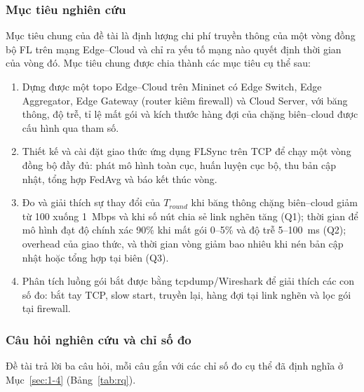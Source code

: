 \subsubsection{Mục tiêu nghiên cứu}
Mục tiêu chung của đề tài là định lượng chi phí truyền thông của một vòng đồng bộ FL trên mạng Edge--Cloud và chỉ ra yếu tố mạng nào quyết định thời gian của vòng đó. Mục tiêu chung được chia thành các mục tiêu cụ thể sau:
\begin{enumerate}
    \item Dựng được một topo Edge--Cloud trên Mininet có Edge Switch, Edge Aggregator, Edge Gateway (router kiêm firewall) và Cloud Server, với băng thông, độ trễ, tỉ lệ mất gói và kích thước hàng đợi của chặng biên--cloud được cấu hình qua tham số.
    \item Thiết kế và cài đặt giao thức ứng dụng FLSync trên TCP để chạy một vòng đồng bộ đầy đủ: phát mô hình toàn cục, huấn luyện cục bộ, thu bản cập nhật, tổng hợp FedAvg và báo kết thúc vòng.
    \item Đo và giải thích sự thay đổi của $T_{round}$ khi băng thông chặng biên--cloud giảm từ 100 xuống 1~Mbps và khi số nút chia sẻ link nghẽn tăng (Q1); thời gian để mô hình đạt độ chính xác 90\% khi mất gói 0--5\% và độ trễ 5--100~ms (Q2); overhead của giao thức, và thời gian vòng giảm bao nhiêu khi nén bản cập nhật hoặc tổng hợp tại biên (Q3).
    \item Phân tích luồng gói bắt được bằng tcpdump/Wireshark để giải thích các con số đo: bắt tay TCP, slow start, truyền lại, hàng đợi tại link nghẽn và lọc gói tại firewall.
\end{enumerate}

\subsubsection{Câu hỏi nghiên cứu và chỉ số đo}
Đề tài trả lời ba câu hỏi, mỗi câu gắn với các chỉ số đo cụ thể đã định nghĩa ở Mục~\ref{sec:1-4} (Bảng~\ref{tab:rq}).

